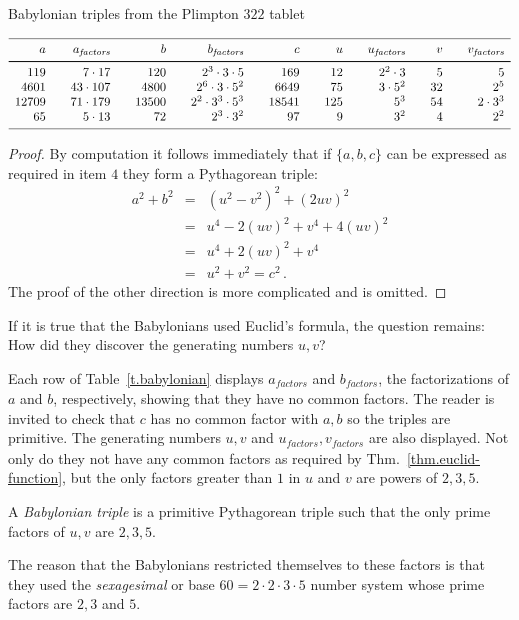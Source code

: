 \begin{table}[b]
\caption{Babylonian triples from the Plimpton $322$ tablet}\label{t.babylonian}
\[
\begin{array}{r@{$\quad\quad$}r@{$\quad\quad$}r@{$\quad\quad$}r@{$\quad\quad$}r@{$\quad\quad$}r@{$\quad\quad$}r@{$\quad\quad$}r@{$\quad\quad$}r}
\hline
\noalign{\smallskip}
a&a_{\textit{factors}}&b&b_{\textit{factors}}&c&u&u_{\textit{factors}}&v&v_{\textit{factors}}\\
\noalign{\smallskip}\svhline\noalign{\smallskip}
119&7\cdot 17 &120&2^3 \cdot 3\cdot 5 & 169&12&2^2\cdot 3&5&5\\
4601 &43\cdot 107&4800&2^6 \cdot 3 \cdot 5^2& 6649&75&3\cdot 5^2&32&2^5\\
12709 &71\cdot 179&13500&2^2 \cdot 3^3 \cdot 5^3& 18541&125&5^3&54&2\cdot 3^3\\
65 &5\cdot 13&72&2^3 \cdot 3^2 & 97&9&3^2&4&2^2\\
\noalign{\smallskip}\hline
\end{array}
\]
\end{table}

\begin{proof}
By computation it follows immediately that if $\{a,b,c\}$ can be expressed as required in item $4$ they form a Pythagorean triple:
\begin{eqnarray*}
a^2+b^2&=&(u^2-v^2)^2 + (2uv)^2\\
&=& u^4-2(uv)^2+v^4+4(uv)^2\\
&=&u^4+2(uv)^2+v^4\\
&=&u^2+v^2=c^2\,.
\end{eqnarray*}
The proof of the other direction is more complicated and is omitted.
\end{proof}
If it is true that the Babylonians used Euclid's formula, the question remains: How did they discover the generating numbers $u,v$?

Each row of Table~\ref{t.babylonian} displays $a_{\textit{factors}}$ and $b_{\textit{factors}}$, the factorizations of $a$ and $b$, respectively, showing that they have no common factors. The reader is invited to check that $c$ has no common factor with $a,b$ so the triples are primitive. The generating numbers $u,v$  and $u_{\textit{factors}}, v_{\textit{factors}}$ are also displayed. Not only do they not have any common factors as required by Thm.~\ref{thm.euclid-function}, but the only factors greater than $1$ in $u$ and $v$ are powers of $2,3,5$.
\begin{definition}
A \emph{Babylonian triple} is a primitive Pythagorean triple such that the only prime factors of $u,v$ are $2,3,5$.
\end{definition}
The reason that the Babylonians restricted themselves to these factors is that they used the \emph{sexagesimal} or base $60=2\cdot 2\cdot 3\cdot 5$ number system whose prime factors are $2,3$ and $5$.

